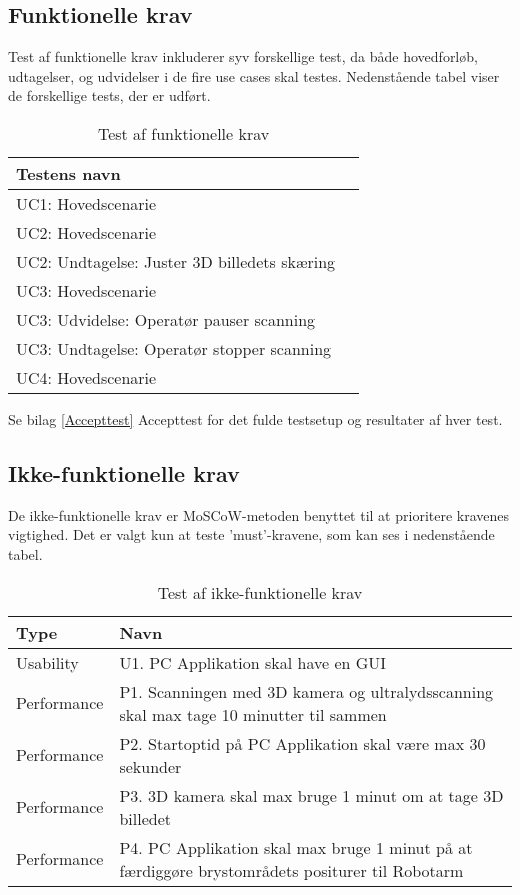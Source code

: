 \subsection{Funktionelle krav} 
Test af funktionelle krav inkluderer syv forskellige test, da både hovedforløb, udtagelser, og udvidelser i de fire use cases skal testes. Nedenstående tabel viser de forskellige tests, der er udført. 

\begin{table}[htb]
\centering
\begin{tabular}{ | l | p{} | } 
\hline
\textbf{Testens navn} \\\hline
UC1: Hovedscenarie\\\hline 
UC2: Hovedscenarie \\\hline 
UC2: Undtagelse: Juster 3D billedets skæring \\\hline 
UC3: Hovedscenarie \\\hline 
UC3: Udvidelse: Operatør pauser scanning \\\hline 
UC3: Undtagelse: Operatør stopper scanning \\\hline 
UC4: Hovedscenarie \\\hline 
\end{tabular}
\caption{Test af funktionelle krav} 
\end{table}

Se bilag \ref{Accepttest} Accepttest for det fulde testsetup og resultater af hver test. 

\subsection{Ikke-funktionelle krav} 
De ikke-funktionelle krav er MoSCoW-metoden benyttet til at prioritere kravenes vigtighed. Det er valgt kun at teste ’must’-kravene, som kan ses i nedenstående tabel. 

\begin{table}[htb]
\centering
\begin{tabular}{ | l | p{} | }
\hline
\textbf{Type} & \textbf{Navn} \\\hline
Usability & U1. PC Applikation skal have en GUI \\\hline 
Performance & P1. Scanningen med 3D kamera og ultralydsscanning skal max tage 10
minutter til sammen \\\hline 
Performance & P2. Startoptid på PC Applikation skal være max 30 sekunder \\\hline
Performance & P3. 3D kamera skal max bruge 1 minut om at tage 3D billedet \\\hline 
Performance & P4. PC Applikation skal max bruge 1 minut på at færdiggøre brystområdets
positurer til Robotarm \\\hline 
\end{tabular}
\caption{Test af ikke-funktionelle krav}
\end{table}

